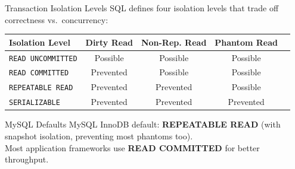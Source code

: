 \begin{frame}{Transaction Isolation Levels}
  SQL defines four isolation levels that trade off correctness vs.\ concurrency:

  \begin{center}
  \renewcommand{\arraystretch}{1.3}
  \small
  \begin{tabular}{@{}lcccc@{}}
    \toprule
    \textbf{Isolation Level} & \textbf{Dirty Read} & \textbf{Non-Rep. Read} & \textbf{Phantom Read} \\
    \midrule
    \texttt{READ UNCOMMITTED} & Possible & Possible & Possible \\
    \texttt{READ COMMITTED}   & \textcolor{green!60!black}{Prevented} & Possible & Possible \\
    \texttt{REPEATABLE READ}  & \textcolor{green!60!black}{Prevented} & \textcolor{green!60!black}{Prevented} & Possible \\
    \texttt{SERIALIZABLE}     & \textcolor{green!60!black}{Prevented} & \textcolor{green!60!black}{Prevented} & \textcolor{green!60!black}{Prevented} \\
    \bottomrule
  \end{tabular}
  \end{center}

  \begin{block}{MySQL Defaults}
    MySQL InnoDB default: \textbf{REPEATABLE READ} (with snapshot isolation, preventing most phantoms too).\\
    Most application frameworks use \textbf{READ COMMITTED} for better throughput.
  \end{block}
\end{frame}

